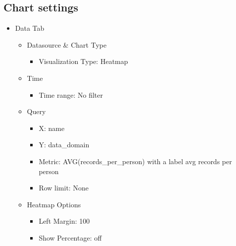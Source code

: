 \documentclass[
]{book}
\providecommand{\tightlist}{%
  \setlength{\itemsep}{0pt}\setlength{\parskip}{0pt}}
\begin{document}
\hypertarget{chart-settings-28}{%
\subsection{Chart settings}\label{chart-settings-28}}

\begin{itemize}
\tightlist
\item
  Data Tab

  \begin{itemize}
  \tightlist
  \item
    Datasource \& Chart Type

    \begin{itemize}
    \tightlist
    \item
      Visualization Type: Heatmap
    \end{itemize}
  \item
    Time

    \begin{itemize}
    \tightlist
    \item
      Time range: No filter
    \end{itemize}
  \item
    Query

    \begin{itemize}
    \tightlist
    \item
      X: name
    \item
      Y: data\_domain
    \item
      Metric: AVG(records\_per\_person) with a label avg records per person
    \item
      Row limit: None
    \end{itemize}
  \item
    Heatmap Options

    \begin{itemize}
    \tightlist
    \item
      Left Margin: 100
    \item
      Show Percentage: off
    \end{itemize}
  \end{itemize}
\end{itemize}

  
\end{document}
